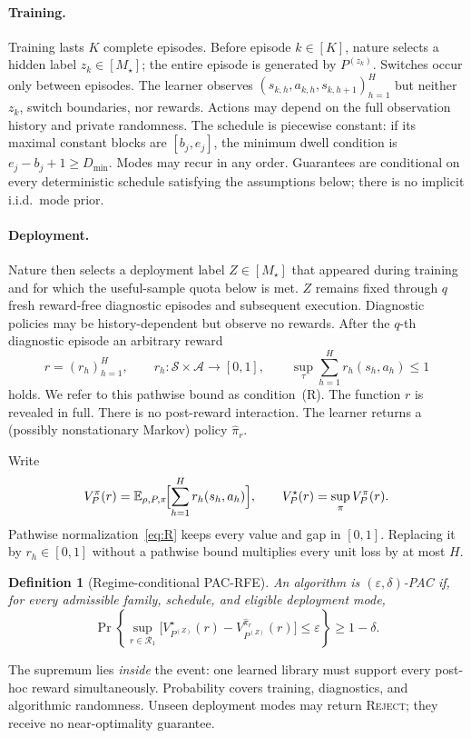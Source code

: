 \documentclass[11pt]{article}
\newtheorem{definition}{Definition}
\newcommand{\Rone}{\mathcal{R}_1}
\newcommand{\E}{\mathbb{E}}
\newcommand{\Prb}{\Pr}
\newcommand{\cS}{\mathcal{S}}
\newcommand{\cA}{\mathcal{A}}
\newcommand{\eps}{\varepsilon}
\begin{document}
\paragraph{Training.}
Training lasts $K$ complete episodes. Before episode $k\in[K]$, nature selects
a hidden label $z_k\in[M_\star]$; the entire episode is generated by
$P^{(z_k)}$. Switches occur only between episodes. The learner observes
$(s_{k,h},a_{k,h},s_{k,h+1})_{h=1}^H$ but neither $z_k$, switch boundaries, nor
rewards. Actions may depend on the full observation history and private
randomness. The schedule is piecewise constant: if its maximal constant blocks
are $[b_j,e_j]$, the minimum dwell condition is $e_j-b_j+1\ge D_{\min}$.
Modes may recur in any order. Guarantees are conditional on every
deterministic schedule satisfying the assumptions below; there is no implicit
i.i.d.\ mode prior.

\paragraph{Deployment.}
Nature then selects a deployment label $Z\in[M_\star]$ that appeared during
training and for which the useful-sample quota below is met. $Z$ remains fixed
through $q$ fresh reward-free diagnostic episodes and subsequent execution.
Diagnostic policies may be history-dependent but observe no rewards. After
the $q$-th diagnostic episode an arbitrary reward
\begin{equation}
\label{eq:R}
r=(r_h)_{h=1}^H,\qquad
r_h:\cS\times\cA\to[0,1],\qquad
\sup_{\tau}\sum_{h=1}^H r_h(s_h,a_h)\le 1
\end{equation}
holds. We refer to this pathwise bound as condition~(R). The function $r$
is revealed in full. There is no post-reward interaction. The learner returns
a (possibly nonstationary Markov) policy $\widehat\pi_r$.

Write
\[
V_P^\pi(r)=\E_{\rho,P,\pi}\!\Bigl[\sum_{h=1}^H r_h(s_h,a_h)\Bigr],
\qquad
V_P^\star(r)=\sup_\pi V_P^\pi(r).
\]
Pathwise normalization~\eqref{eq:R} keeps every value and gap in $[0,1]$.
Replacing it by $r_h\in[0,1]$ without a pathwise bound multiplies every unit
loss by at most $H$.

\begin{definition}[Regime-conditional PAC-RFE]
\label{def:pac}
An algorithm is $(\eps,\delta)$-PAC if, for every admissible family, schedule,
and eligible deployment mode,
\begin{equation}
\label{eq:PAC}
\Prb\!\left\{\sup_{r\in\Rone}
\bigl[V_{P^{(Z)}}^\star(r)-V_{P^{(Z)}}^{\widehat\pi_r}(r)\bigr]
\le\eps\right\}\ge 1-\delta.
\end{equation}
\end{definition}
The supremum lies \emph{inside} the event: one learned library must support
every post-hoc reward simultaneously. Probability covers training,
diagnostics, and algorithmic randomness. Unseen deployment modes may return
\textsc{Reject}; they receive no near-optimality guarantee.
\end{document}
